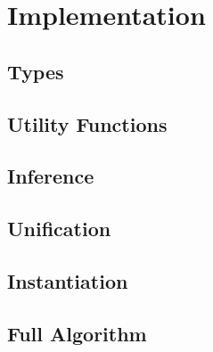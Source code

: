 \chapter{Implementation}
\section{Types}
\section{Utility Functions}
\section{Inference}
\section{Unification}
\section{Instantiation}
\section{Full Algorithm}
